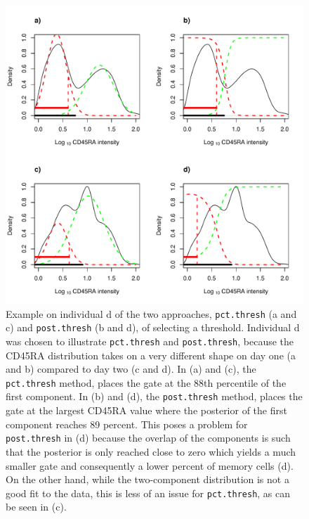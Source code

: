 \begin{figure}[h]
\centering
  \includegraphics[scale=.6]{figures/cd45ra-threshold-example.pdf}
{ Example on individual d of the two approaches, \texttt{pct.thresh} (a and c) and \texttt{post.thresh} (b and d), of selecting a threshold. }
{
  Individual d was chosen to illustrate \texttt{pct.thresh} and \texttt{post.thresh}, because
  the CD45RA distribution takes on a very different shape on day one (a and b) compared to day two (c and d).
  In (a) and (c), the \texttt{pct.thresh} method, places the gate at the 88th percentile of the first component.
  In (b) and (d), the \texttt{post.thresh} method, places the gate at the largest CD45RA value where the posterior of the first component reaches 89 percent.
  This poses a problem for \texttt{post.thresh} in (d) because the overlap of the components is such that the posterior is only reached close to zero
  which yields a much smaller gate and consequently a lower percent of memory cells (d).
  On the other hand, while the two-component distribution is not a good fit to the data, this is less of an issue for \texttt{pct.thresh}, as can be seen in (c).
}
\end{figure}



